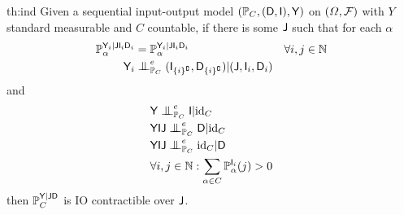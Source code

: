 \begin{reptheorem}{th:ind}
Given a sequential input-output model $(\mathbb{P}_C,(\mathsf{D},\mathsf{I}),\mathsf{Y})$ on $(\Omega,\mathcal{F})$ with $Y$ standard measurable and $C$ countable, if there is some $\mathsf{J}$ such that for each $\alpha$
\begin{align}
    \prob{P}_\alpha^{\RV{Y}_i|\RV{J}\RV{I}_i\RV{D}_i} &= \prob{P}_\alpha^{\RV{Y}_i|\RV{J}\RV{I}_i\RV{D}_i} &\forall i,j\in \mathbb{N}\\
    \RV{Y}_i&\CI^e_{\prob{P}_C} (\RV{I}_{\{i\}^{\complement}},\RV{D}_{\{i\}^{\complement}})|(\RV{J},\RV{I}_i,\RV{D}_i)
\end{align}
and
\begin{align}
    &\RV{Y}\CI^e_{\prob{P}_C} \RV{I} | \text{id}_C\\
    &\RV{YIJ}\CI^e_{\prob{P}_C} \RV{D}|\text{id}_C\\
    &\RV{YIJ}\CI^e_{\prob{P}_C} \text{id}_C|\RV{D}\\
    &\forall i,j\in \mathbb{N}: \sum_{\alpha\in C} \prob{P}_\alpha^{\RV{I}_i}(j)>0
\end{align}
then $\mathbb{P}_C^{\mathsf{Y}|\mathsf{JD}}$ is IO contractible over $\mathsf{J}$.
\end{reptheorem}


